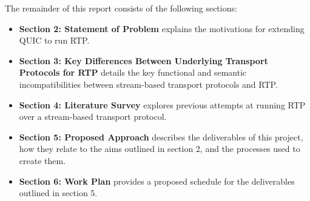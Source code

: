 \documentclass{mprop}
\begin{document}


The remainder of this report consists of the following sections:

\begin{itemize}
	\item \textbf{Section 2: Statement of Problem} explains the motivations for extending QUIC to 
	run RTP.
	\item \textbf{Section 3: Key Differences Between Underlying Transport Protocols for RTP} 
	details the key functional and semantic incompatibilities between stream-based transport 
	protocols and RTP.
	\item \textbf{Section 4: Literature Survey} explores previous attempts at running RTP over a 
	stream-based transport protocol.
	\item \textbf{Section 5: Proposed Approach} describes the deliverables of this project, how 
	they relate to the aims outlined in section 2, and the processes used to create them.
	\item \textbf{Section 6: Work Plan} provides a proposed schedule for the deliverables outlined 
	in section 5.
\end{itemize}

\end{document}
